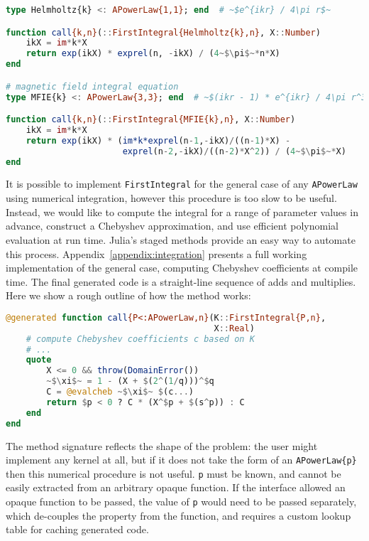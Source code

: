 \begin{singlespace}
\begin{lstlisting}[language=julia]
type Helmholtz{k} <: APowerLaw{1,1}; end  # ~$e^{ikr} / 4\pi r$~

function call{k,n}(::FirstIntegral{Helmholtz{k},n}, X::Number)
    ikX = im*k*X
    return exp(ikX) * exprel(n, -ikX) / (4~$\pi$~*n*X)
end

# magnetic field integral equation
type MFIE{k} <: APowerLaw{3,3}; end  # ~$(ikr - 1) * e^{ikr} / 4\pi r^3$~

function call{k,n}(::FirstIntegral{MFIE{k},n}, X::Number)
    ikX = im*k*X
    return exp(ikX) * (im*k*exprel(n-1,-ikX)/((n-1)*X) -
                       exprel(n-2,-ikX)/((n-2)*X^2)) / (4~$\pi$~*X)
end
\end{lstlisting}
\end{singlespace}

It is possible to implement \texttt{FirstIntegral} for the general
case of any \texttt{APowerLaw} using numerical integration, however
this procedure is too slow to be useful.
Instead, we would like to compute the integral for a range of
parameter values in advance, construct a Chebyshev approximation,
and use efficient polynomial evaluation at run time.
Julia's staged methods provide an easy way to automate this process.
Appendix~\ref{appendix:integration} presents a full working implementation of
the general case, computing Chebyshev coefficients at compile time.
The final generated code is a straight-line sequence of adds and multiplies.
Here we show a rough outline of how the method works:

\begin{singlespace}
\begin{lstlisting}[language=julia]
@generated function call{P<:APowerLaw,n}(K::FirstIntegral{P,n},
                                         X::Real)
    # compute Chebyshev coefficients c based on K
    # ...
    quote
        X <= 0 && throw(DomainError())
        ~$\xi$~ = 1 - (X + $(2^(1/q)))^$q
        C = @evalcheb ~$\xi$~ $(c...)
        return $p < 0 ? C * (X^$p + $(s^p)) : C
    end
end
\end{lstlisting}
\end{singlespace}

The method signature reflects the shape of the problem: the user might
implement any kernel at all, but if it does not take the form of an
\texttt{APowerLaw\{p\}} then this numerical procedure is not useful.
\texttt{p} must be known, and cannot be easily extracted from an arbitrary
opaque function.
If the interface allowed an opaque function to be passed, the value of
\texttt{p} would need to be passed separately, which de-couples the
property from the function, and requires a custom lookup table for caching
generated code.

